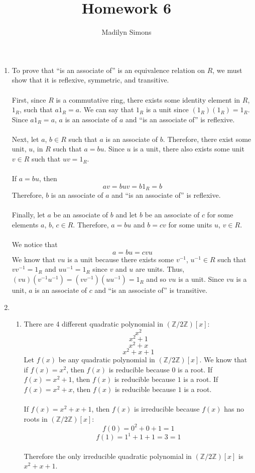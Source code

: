 \documentclass{article}
\title{Homework 6}
\author{Madilyn Simons}
\date{}
\newcommand{\Z}{\mathbb{Z}}
\begin{document}
\maketitle

\begin{enumerate}

\item To prove that ``is an associate of'' is an equivalence relation on $R$, we
must show that it is reflexive, symmetric, and transitive.
\\
\\
First, since $R$ is a commutative ring, there exists some identity element in
$R$, $1_R$, such that $a1_R = a$.  We can say that $1_R$ is a unit since
$(1_{R})  (1_{R}) = 1_{R}$.  Since $a1_R = a$, $a$ is an associate of $a$
and ``is an associate of'' is reflexive.
\\
\\
Next, let $a$, $b \in R$ such that $a$ is an associate of $b$.  Therefore,
there exist some unit, $u$, in $R$ such that $a = bu$.  Since $u$ is a unit,
there also exists some unit $v \in R$ such that $uv = 1_R$.
\\
\\
If $a = bu$, then
\[
av = buv = b1_{R} = b
\]
Therefore, $b$ is an associate of $a$ and ``is an associate of'' is reflexive.
\\
\\
Finally, let $a$ be an associate of $b$ and let $b$ be an associate of $c$ for
some elements $a$, $b$, $c \in R$.  Therefore, $a = bu$ and $b = cv$ for some
units $u$, $v \in R$.
\\
\\
We notice that
\[
a = bu = cvu
\]
We know that $vu$ is a unit because there exists some
$v^{-1}$, $u^{-1} \in R$ such that $vv^{-1} = 1_R$ and $uu^{-1} = 1_R$ since
$v$ and $u$ are units.  Thus, $(vu)(v^{-1}u^{-1}) = (vv^{-1})(uu^{-1}) = 1_R$
and so $vu$ is a unit.  Since $vu$ is a unit, $a$ is an associate of $c$ and
``is an associate of'' is transitive.

\item
\begin{enumerate}
\item There are 4 different quadratic polynomial in $(\Z/2\Z)[x]$:
\[
x^2
\] \[
x^2 + 1
\] \[
x^2 + x
\] \[
x^2 + x + 1
\]
Let $f(x)$ be any quadratic polynomial in $(\Z/2\Z)[x]$.  We know that
if $f(x) = x^2$, then $f(x)$ is reducible because $0$ is a root.
If $f(x) = x^2 + 1$, then $f(x)$ is reducible because $1$ is a root.
If $f(x) = x^2 + x$, then $f(x)$ is reducible because $1$ is a root.
\\ \\
If $f(x) = x^2 + x + 1$, then $f(x)$ is irreducible because $f(x)$ has no roots
in $(\Z/2\Z)[x]$:
\[
f(0) = 0^2 + 0 + 1 = 1
\] \[
f(1) = 1^1 + 1 + 1 = 3 = 1
\]
\\
Therefore the only irreducible quadratic polynomial in $(\Z/2\Z)[x]$ is
$x^2 + x + 1$.


\end{enumerate}
\end{enumerate}
\end{document}
